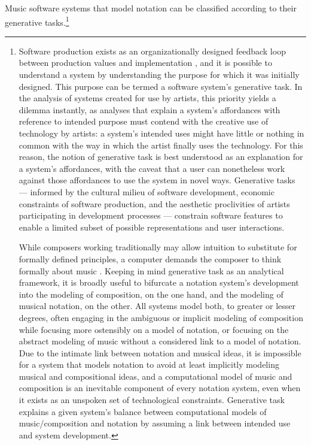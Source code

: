 \documentclass{article}
\begin{document}
Music software systems that model notation can be classified according to their generative tasks.\footnote{Software production exists as an organizationally designed feedback loop
between production values and implementation \cite{Derniame:1999fk}, and it is
possible to understand a system by understanding the purpose for which it was
initially designed. This purpose can be termed a software system's generative task. In the analysis of
systems created for use by artists, this priority yields a dilemma instantly,
as analyses that explain a system's affordances with reference to intended
purpose must contend with the creative use of technology by artists: a system's
intended uses might have little or nothing in common with the way in which the
artist finally uses the technology. For this reason, the notion of generative
task is best understood as an explanation for a system's affordances, with the
caveat that a user can nonetheless work against those affordances to use the
system in novel ways. Generative tasks --- informed by the cultural milieu of
software development, economic constraints of software production, and the
aesthetic proclivities of artists participating in development processes ---
constrain software features to enable a limited subset of possible
representations and user interactions.

While composers working traditionally may allow intuition to substitute for
formally defined principles, a computer demands the composer to think formally
about music \cite{Xenakis:1992rq}. Keeping in mind generative task as an
analytical framework, it is broadly useful to bifurcate a  notation
system's development into the modeling of composition, on the one
hand, and the modeling of musical notation, on the other. All systems model
both, to greater or lesser degrees, often engaging in the ambiguous or implicit
modeling of composition while focusing more ostensibly on a model of
notation, or focusing on the abstract modeling of music without a considered
link to a model of notation. Due to the intimate link between notation and
musical ideas, it is impossible for a system that models notation to avoid at
least implicitly modeling musical and compositional ideas, and a computational
model of music and composition is an inevitable component of every
notation system, even when it exists as an unspoken set of technological
constraints. Generative task explains a given system's balance between
computational models of music/composition and notation by assuming a link
between intended use and system development.}
\end{document}
